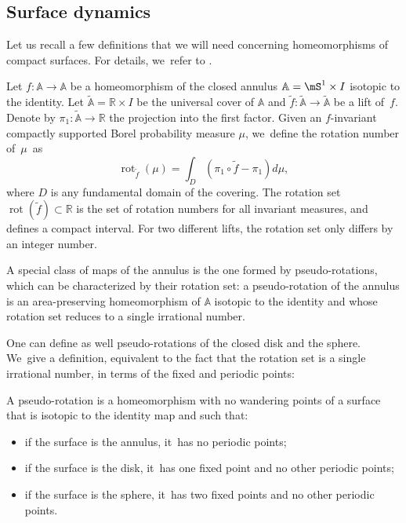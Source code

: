 \subsection{Surface dynamics}\label{ssec-surfacedyn}
Let us recall a few definitions that we will need concerning homeomorphisms of compact surfaces. For details, we~refer to \cite{BCLP, Lec1}.

Let $f: \mathbb{A}\to \mathbb{A}$ be a homeomorphism of the closed annulus $\mathbb{A}=\mS^1\times I$ isotopic to the identity. Let $\widetilde{\mathbb{A}}=\mathbb{R}\times I$ be
the universal cover of $\mathbb{A}$ and $\widetilde f: \widetilde{\mathbb{A}} \to \widetilde{\mathbb{A}}$ be a lift of~$f$. Denote by $\pi_1: \widetilde{\mathbb{A}} \to \mathbb{R}$ the projection into the first factor. Given an $f$-invariant compactly supported Borel probability measure $\mu$, we~define the rotation number of~$\mu$~as
\[
\operatorname{rot}_{\widetilde f}(\mu)=\int_D (\pi_1\circ \widetilde f - \pi_1)d\mu,
\]
where $D$ is any fundamental domain of the covering. The rotation set $\operatorname{rot}(\widetilde f)\subset \mathbb{R}$ is the set of rotation numbers for all invariant measures, and defines a compact interval. For two different lifts, the rotation set only differs by an integer number.

A special class of maps of the annulus is the one formed by pseudo-rotations, which can be characterized by their rotation set:
a pseudo-rotation of the annulus is an area-preserving homeomorphism of $\mathbb{A}$ isotopic to the identity and whose rotation set reduces to a single irrational number.

One can define as well pseudo-rotations of the closed disk and the sphere. We~give a definition, equivalent to the fact that the rotation set is a single irrational number, in terms of the fixed and periodic points:
\begin{defi}
A pseudo-rotation is a homeomorphism with no wandering points of a surface that is isotopic to the identity map and such that:
\begin{itemize}
\item
if the surface is the annulus, it~has no periodic points;
\item
if the surface is the disk, it~has one fixed point and no other periodic points;
\item
if the surface is the sphere, it~has two fixed points and no other periodic points.
\end{itemize}
\end{defi}

